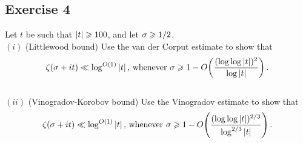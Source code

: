 \subsection{Exercise 4}

\begin{theorem}
    Let $t$ be such that $\left\lvert t \right\rvert \geqslant 100$, and let $\sigma \geqslant 1/2$. \\
    $(i)$ (Littlewood bound) Use the van der Corput estimate to show that $$\zeta(\sigma+it) \ll \log^{O(1)} \left\lvert t \right\rvert \text{, whenever } \sigma \geqslant 1 - O\! \left( \frac{(\log\log \left\lvert t \right\rvert)^2}{\log \left\lvert t \right\rvert} \right).$$ \\
    $(ii)$ (Vinogradov-Korobov bound) Use the Vinogradov estimate to show that $$\zeta(\sigma+it) \ll \log^{O(1)} \left\lvert t \right\rvert \text{, whenever } \sigma \geqslant 1 - O\! \left( \frac{(\log\log \left\lvert t \right\rvert)^{2/3}}{\log^{2/3} \left\lvert t \right\rvert} \right).$$
\end{theorem}

